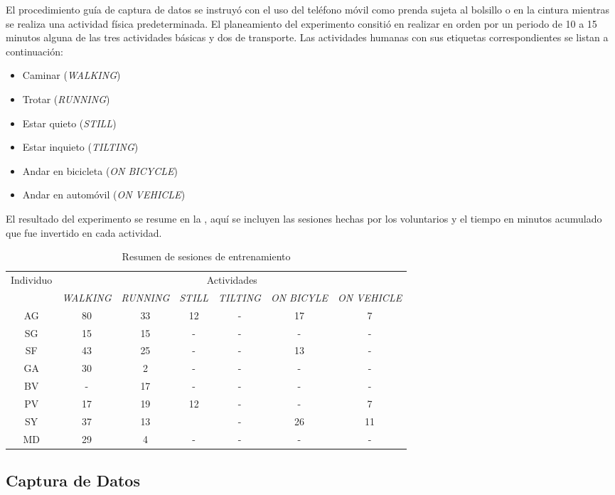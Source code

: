 El procedimiento guía de captura de datos se instruyó con el uso del
teléfono móvil como prenda sujeta al bolsillo o en la cintura mientras
se realiza una actividad física predeterminada. El planeamiento del
experimento consitió en realizar en orden por un periodo de 10 a 15
minutos alguna de las tres actividades básicas y dos de transporte.
Las actividades humanas con sus etiquetas correspondientes se listan
a continuación:
\begin{itemize}
\item Caminar (\emph{WALKING})
\item Trotar (\emph{RUNNING})
\item Estar quieto (\emph{STILL})
\item Estar inquieto (\emph{TILTING})
\item Andar en bicicleta (\emph{ON BICYCLE})
\item Andar en automóvil (\emph{ON VEHICLE})
\end{itemize}
El resultado del experimento se resume en la ,
aquí se incluyen las sesiones hechas por los voluntarios y el tiempo
en minutos acumulado que fue invertido en cada actividad. 

\begin{table}[h]
\begin{centering}
\begin{tabular}{|c|c|c|c|c|c|c|}
\hline 
\multirow{2}{*}{Individuo} & \multicolumn{6}{c|}{Actividades}\tabularnewline
\cline{2-7} 
 & \emph{\footnotesize{}WALKING} & \emph{\footnotesize{}RUNNING} & \emph{\footnotesize{}STILL} & \emph{\footnotesize{}TILTING} & \emph{\footnotesize{}ON BICYLE} & \emph{\footnotesize{}ON VEHICLE}\tabularnewline
\hline 
\hline 
AG & 80 & 33 & 12 & - & 17 & 7\tabularnewline
\hline 
SG & 15 & 15 & - & - & - & -\tabularnewline
\hline 
SF & 43 & 25 & - & - & 13 & -\tabularnewline
\hline 
GA & 30 & 2 & - & - & - & -\tabularnewline
\hline 
BV & - & 17 & - & - & - & -\tabularnewline
\hline 
PV & 17 & 19 & 12 & - & - & 7\tabularnewline
\hline 
SY & 37 & 13 &  & - & 26 & 11\tabularnewline
\hline 
MD & 29 & 4 & - & - & - & -\tabularnewline
\hline 
\end{tabular}
\par\end{centering}
\caption{\label{tab6:sesiones}Resumen de sesiones de entrenamiento}
\end{table}


\subsection{Captura de Datos}

